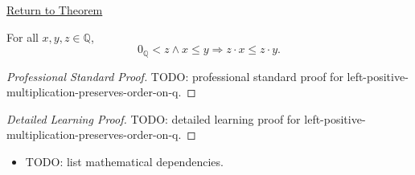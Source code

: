 \newpage
{}
\label{prf:left-positive-multiplication-preserves-order-on-q}

\begin{remark*}[Return]
\hyperref[thm:left-positive-multiplication-preserves-order-on-q]{Return to Theorem}
\end{remark*}

\begin{theorem*}
For all $x,y,z\in\mathbb{Q}$,
\[
0_{\mathbb{Q}}<z\land x\le y
\Longrightarrow
z\cdot x\le z\cdot y.
\]
\end{theorem*}

\begin{proof}[Professional Standard Proof]
\LRAProofBodyStart
TODO: professional standard proof for left-positive-multiplication-preserves-order-on-q.
\end{proof}

\begin{proof}[Detailed Learning Proof]
\LRAProofBodyStart
TODO: detailed learning proof for left-positive-multiplication-preserves-order-on-q.
\end{proof}

\begin{remark*}
\end{remark*}

\begin{dependencies}
\begin{itemize}
  \item TODO: list mathematical dependencies.
\end{itemize}
\end{dependencies}

\clearpage
